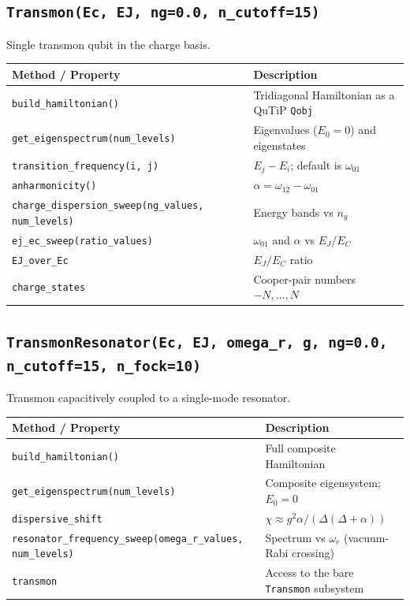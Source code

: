 \documentclass[11pt]{article}
\begin{document}
\subsection{\texttt{Transmon(Ec, EJ, ng=0.0, n\_cutoff=15)}}

Single transmon qubit in the charge basis.

\begin{center}
\begin{tabular}{@{}ll@{}}
\toprule
Method / Property & Description \\
\midrule
\texttt{build\_hamiltonian()} & Tridiagonal Hamiltonian as a QuTiP \texttt{Qobj} \\
\texttt{get\_eigenspectrum(num\_levels)} & Eigenvalues ($E_0 = 0$) and eigenstates \\
\texttt{transition\_frequency(i, j)} & $E_j - E_i$; default is $\omega_{01}$ \\
\texttt{anharmonicity()} & $\alpha = \omega_{12} - \omega_{01}$ \\
\texttt{charge\_dispersion\_sweep(ng\_values, num\_levels)} & Energy bands vs $n_g$ \\
\texttt{ej\_ec\_sweep(ratio\_values)} & $\omega_{01}$ and $\alpha$ vs $E_J/E_C$ \\
\texttt{EJ\_over\_Ec} & $E_J/E_C$ ratio \\
\texttt{charge\_states} & Cooper-pair numbers $-N,\ldots,N$ \\
\bottomrule
\end{tabular}
\end{center}

\subsection{\texttt{TransmonResonator(Ec, EJ, omega\_r, g, ng=0.0, n\_cutoff=15, n\_fock=10)}}

Transmon capacitively coupled to a single-mode resonator.

\begin{center}
\begin{tabular}{@{}ll@{}}
\toprule
Method / Property & Description \\
\midrule
\texttt{build\_hamiltonian()} & Full composite Hamiltonian \\
\texttt{get\_eigenspectrum(num\_levels)} & Composite eigensystem; $E_0 = 0$ \\
\texttt{dispersive\_shift} & $\chi \approx g^2\alpha / (\Delta(\Delta + \alpha))$ \\
\texttt{resonator\_frequency\_sweep(omega\_r\_values, num\_levels)} & Spectrum vs $\omega_r$ (vacuum-Rabi crossing) \\
\texttt{transmon} & Access to the bare \texttt{Transmon} subsystem \\
\bottomrule
\end{tabular}
\end{center}
\end{document}
